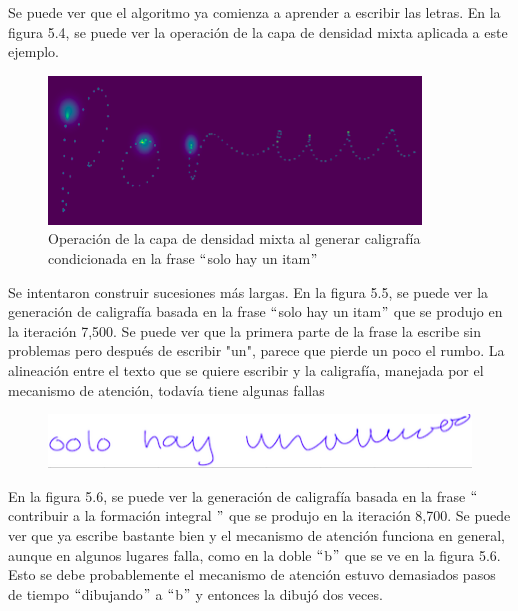 Se puede ver que el algoritmo ya comienza a aprender a escribir las letras. En la figura 5.4, se puede ver la operación de la capa de densidad mixta aplicada a este ejemplo.

\begin{figure}[h]
\begin{center}
\includegraphics{./imag/porunmexico4700g.png}
\end{center}
\caption{Operación de la capa de densidad mixta al generar caligrafía condicionada en la frase $``$solo hay un itam$"$}
\end{figure}

Se intentaron construir sucesiones más largas. En la figura 5.5, se puede ver la generación de caligrafía basada en la frase $``$solo hay un itam$"$ que se produjo en la iteración 7,500. Se puede ver que la primera parte de la frase la escribe sin problemas pero después de escribir "un", parece que pierde un poco el rumbo. La alineación entre el texto que se quiere escribir y la caligrafía, manejada por el mecanismo de atención, todavía tiene algunas fallas


\begin{figure}[h]
\begin{center}
\includegraphics{./imag/solo7500.png}
\end{center}
\caption{}
\end{figure}

\vspace{1em}

En la figura 5.6, se puede ver la generación de caligrafía basada en la frase $``$contribuir a la formación integral $"$ que se produjo en la iteración 8,700. Se puede ver que ya escribe bastante bien y el mecanismo de atención funciona en general, aunque en algunos lugares falla, como en la doble $``$b$"$ que se ve en la figura 5.6. Esto se debe probablemente el mecanismo de atención estuvo demasiados pasos de tiempo $``$dibujando$"$ a $``$b$"$ y entonces la dibujó dos veces. 


